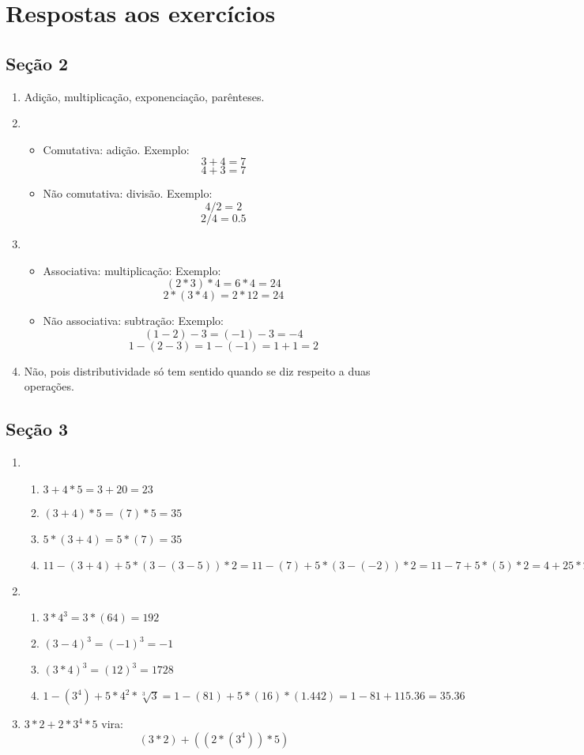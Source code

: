 \documentclass{article}
\begin{document}
\newpage

\section{Respostas aos exercícios}
\subsection{Seção 2}
\begin{enumerate}
	\item Adição, multiplicação, exponenciação, parênteses.
	\item 
	\begin{itemize}
		\item Comutativa: adição. Exemplo:
$$3 + 4 = 7$$
$$4 + 3 = 7$$
		\item Não comutativa: divisão. Exemplo:
$$4 / 2 = 2$$
$$2 / 4 = 0.5$$
	\end{itemize}
	\item 
	\begin{itemize}
		\item Associativa: multiplicação: Exemplo:
$$(2 * 3) * 4 = 6*4 = 24$$
$$2 * (3 * 4) = 2*12 = 24$$
		\item Não associativa: subtração: Exemplo:
$$(1 - 2) - 3 = (-1) - 3 = -4$$
$$1 - (2 - 3) = 1 - (-1) = 1 + 1 = 2$$
	\end{itemize}
	\item Não, pois distributividade só tem sentido quando se diz respeito a
duas operações.
\end{enumerate}

\subsection{Seção 3}
\begin{enumerate}
	\item 
	\begin{enumerate}
		\item $3 + 4*5 = 3 + 20 = 23$
		\item $(3 + 4)*5 = (7)*5 = 35$
		\item $5*(3 + 4) = 5*(7) = 35$
		\item $11 - (3 + 4) + 5*(3 - (3 - 5))*2 = 11 - (7) + 5*(3 - (-2))*2 =
11 - 7 + 5*(5)*2 = 4 + 25*2 = 54$
	\end{enumerate}
	\item 
	\begin{enumerate}
		\item $3 * 4^3 = 3*(64) = 192$
		\item ${(3 - 4)}^3 = {(-1)}^3 = -1$
		\item ${(3 * 4)}^3 = {(12)}^3 = 1728$
		\item $1 - (3^4) + 5*4^2*\sqrt[3]{3} = 1 - (81) + 5*(16)*(1.442) =
1 - 81 + 115.36 = 35.36$
	\end{enumerate}
	\item $3*2 + 2*3^4*5$ vira:
$$(3*2) + ((2*(3^4))*5)$$
\end{enumerate}
\end{document}
